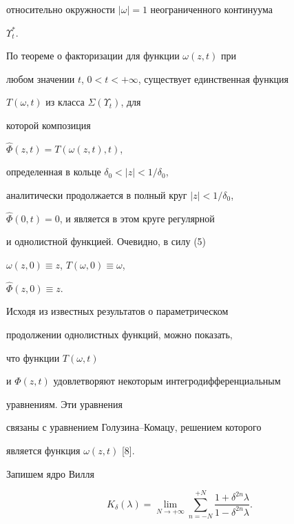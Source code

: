 относительно окружности $|\omega|=1$ неограниченного континуума 


$\Upsilon_{t}^{*}$. 





По теореме о факторизации для функции $\omega(z,t)$ при


любом значении $t$, $0<t<+\infty$, существует единственная функция


$T(\omega,t)$ из класса $\Sigma(\Upsilon_{t})$, для


которой композиция 


$\widehat{\Phi}(z,t)=T(\omega(z,t),t)$,


определенная в кольце $\delta_{0}<|z|<1/\delta_{0}$,


аналитически продолжается в полный круг $|z|<1/\delta_{0}$,


$\widehat{\Phi}(0,t)=0$, и является в этом круге регулярной


и однолистной функцией. Очевидно, в силу (5) 


$\omega(z,0)\equiv z$, $T(\omega,0)\equiv \omega$,


$\widehat{\Phi}(z,0)\equiv z$.





Исходя из известных результатов о параметрическом


продолжении однолистных функций, можно показать, 


что функции $T(\omega,t)$


и $\Phi(z,t)$ удовлетворяют некоторым интегродифференци\-альным


уравнениям. Эти уравнения


связаны с уравнением Голузина--Комацу, решением которого


является функция $\omega(z,t)$ [8].





Запишем ядро Вилля


$$


K_{\delta}(\lambda)=\lim_{N\to+\infty}\sum\limits_{n=-N}^{+N}


\frac{1+\delta^{2n}\lambda}{1-\delta^{2n}\lambda}.


$$





